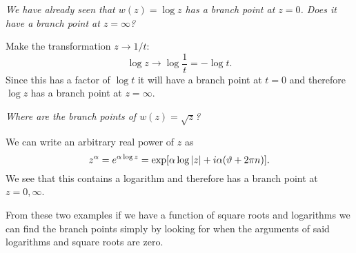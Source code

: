 \documentclass{article}
\begin{document}
    \begin{example}
        \textit{We have already seen that \(w(z) = \log z\) has a branch point at \(z = 0\).
        Does it have a branch point at \(z = \infty\)?}
        
        Make the transformation \(z \to 1/t\):
        \[\log z \to \log \frac{1}{t} = -\log t.\]
        Since this has a factor of \(\log t\) it will have a branch point at \(t = 0\) and therefore \(\log z\) has a branch point at \(z = \infty\).
    \end{example}
    \begin{example}
        \textit{Where are the branch points of \(w(z) = \sqrt{z}\)?}
        
        We can write an arbitrary real power of \(z\) as
        \[z^{\alpha} = e^{\alpha\log z} = \exp[\alpha\log\abs{z} + i\alpha(\vartheta + 2\pi n)].\]
        We see that this contains a logarithm and therefore has a branch point at \(z = 0, \infty\).
    \end{example}
    From these two examples if we have a function of square roots and logarithms we can find the branch points simply by looking for when the arguments of said logarithms and square roots are zero.
    
\end{document}
